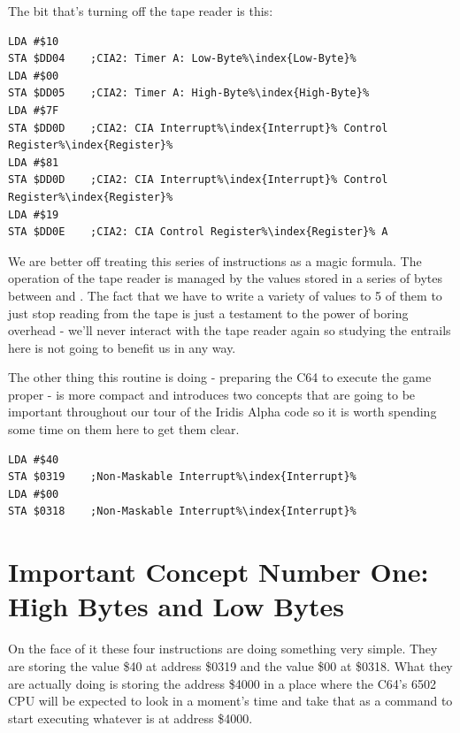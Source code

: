 The bit that's turning off the tape reader is this:

\begin{lstlisting}[escapechar=\%]
LDA #$10
STA $DD04    ;CIA2: Timer A: Low-Byte%\index{Low-Byte}%
LDA #$00
STA $DD05    ;CIA2: Timer A: High-Byte%\index{High-Byte}%
LDA #$7F
STA $DD0D    ;CIA2: CIA Interrupt%\index{Interrupt}% Control Register%\index{Register}%
LDA #$81
STA $DD0D    ;CIA2: CIA Interrupt%\index{Interrupt}% Control Register%\index{Register}%
LDA #$19
STA $DD0E    ;CIA2: CIA Control Register%\index{Register}% A
\end{lstlisting}

We are better off treating this series of instructions as a magic formula. The operation of the tape reader
is managed by the values stored in a series of bytes between  and . The fact that
we have to write a variety of values to 5 of them to just stop reading from the tape is just a testament
to the power of boring overhead - we'll never interact with the tape reader again so studying the entrails
here is not going to benefit us in any way.

The other thing this routine is doing - preparing the C64 to execute the game proper - is more compact and
introduces two concepts that are going to be important throughout our tour of the Iridis Alpha code so it
is worth spending some time on them here to get them clear.

\begin{lstlisting}[caption=Containing two important concepts.,escapechar=\%]
LDA #$40
STA $0319    ;Non-Maskable Interrupt%\index{Interrupt}%
LDA #$00
STA $0318    ;Non-Maskable Interrupt%\index{Interrupt}%
\end{lstlisting}

\section{Important Concept Number One: High Bytes and Low Bytes}
On the face of it these four instructions are doing something very simple. They are storing the value \$40
at address \$0319 and the value \$00 at \$0318. What they are actually doing is storing the address \$4000
in a place where the C64's 6502 CPU will be expected to look in a moment's time and take that as a command
to start executing whatever is at address \$4000.


